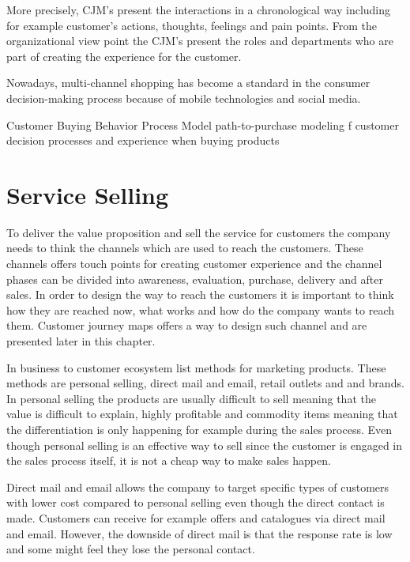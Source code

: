 More precisely, CJM's present the interactions in a chronological way including for example customer's actions, thoughts, feelings and pain points. From the organizational view point the CJM's present the roles and departments who are part of creating the experience for the customer. \parencite{Kalbach:2016}

Nowadays, multi-channel shopping has become a standard in the consumer decision-making process because of mobile technologies and social media. 

Customer Buying Behavior Process Model
path-to-purchase modeling
f customer decision processes and
experience when buying products

\section{Service Selling}

To deliver the value proposition and sell the service for customers the company needs to think the channels which are used to reach the customers. These channels offers touch points for creating customer experience and the channel phases can be divided into awareness, evaluation, purchase, delivery and after sales. In order to design the way to reach the customers it is important to think how they are reached now, what works and how do the company wants to reach them. \parencite{BusinessModelGeneration:2010} Customer journey maps offers a way to design such channel and are presented later in this chapter.

In business to customer ecosystem \textcite{MarketingPlans:2016} list methods for marketing products. These methods are personal selling, direct mail and email, retail outlets and and brands. In personal selling the products are usually difficult to sell meaning that the value is difficult to explain, highly profitable and commodity items meaning that the differentiation is only happening for example during the sales process. Even though personal selling is an effective way to sell since the customer is engaged in the sales process itself, it is not a cheap way to make sales happen.

Direct mail and email allows the company to target specific types of customers with lower cost compared to personal selling even though the direct contact is made. Customers can receive for example offers and catalogues via direct mail and email. However, the downside of direct mail is that the response rate is low and some might feel they lose the personal contact. \parencite{MarketingPlans:2016}

